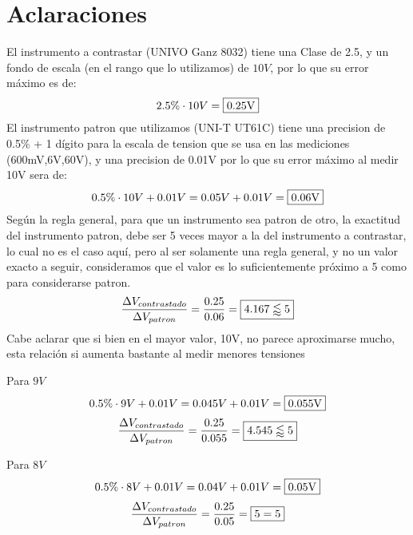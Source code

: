 \section{Aclaraciones}
El instrumento a contrastar (UNIVO Ganz 8032) tiene una Clase de 2.5, y un fondo de escala (en el rango que lo utilizamos) de $10V$, por lo que su error máximo es de:
$$2.5\% \cdot 10V = \framebox{0.25V}$$
El instrumento patron que utilizamos (UNI-T UT61C) tiene una precision de 0.5\% + 1 dígito para la escala de tension que se usa en las mediciones (600mV,6V,60V), y una precision de 0.01V por lo que su error máximo al medir 10V sera de:
$$0.5\% \cdot 10V + 0.01V = 0.05V + 0.01V = \framebox{0.06V}$$
Según la regla general, para que un instrumento sea patron de otro, la exactitud del instrumento patron, debe ser 5 veces mayor a la del instrumento a contrastar, lo cual no es el caso aquí, pero al ser solamente una regla
general, y no un valor exacto a seguir, consideramos que el valor es lo suficientemente próximo a 5 como para considerarse patron.
$$\dfrac{\Delta V_{contrastado}}{\Delta V_{patron}} = \dfrac{0.25}{0.06} = \framebox{$4.167 \lessapprox 5$}$$
Cabe aclarar que si bien en el mayor valor, 10V, no parece aproximarse mucho, esta relación si aumenta bastante al medir menores tensiones

Para $9V$
$$0.5\% \cdot 9V + 0.01V = 0.045V + 0.01V = \framebox{0.055V}$$
$$\dfrac{\Delta V_{contrastado}}{\Delta V_{patron}} = \dfrac{0.25}{0.055} = \framebox{$4.545 \lessapprox 5$}$$

Para $8V$
$$0.5\% \cdot 8V + 0.01V = 0.04V + 0.01V = \framebox{0.05V}$$
$$\dfrac{\Delta V_{contrastado}}{\Delta V_{patron}} = \dfrac{0.25}{0.05} = \framebox{$5 = 5$}$$

